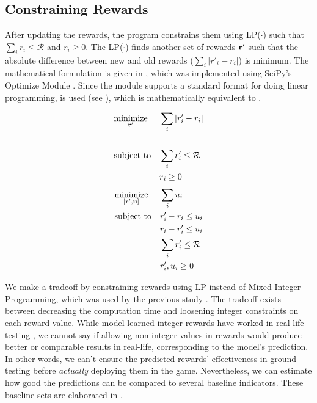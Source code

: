 \subsection{Constraining Rewards} \label{sec:Constraining Rewards}
After updating the rewards, the program constrains them using LP($\cdot$) such that $\sum_{i}r_i \leq \mathcal{R}$ and $r_i \geq 0$. The LP($\cdot$) finds another set of rewards $\mathbf{r'}$ such that the absolute difference between new and old rewards ($\sum_{i}|r'_i - r_i|$) is minimum. The mathematical formulation is given in , which was implemented using SciPy's Optimize Module \cite{SCPOptimizeDocs}. Since the module supports a standard format for doing linear programming,  is used (see ), which is mathematically equivalent to .
\begin{multicols}{2}
    \begin{equation} \label{eqn:lp_math_constrain_rewards}
        \begin{aligned}
            & \underset{\mathbf{r'}}{\text{minimize}}
            & & \sum_{i}|r'_i - r_i|\\ \\
            & \text{subject to}
            & & \sum_{i}r'_i \leq \mathcal{R}\\
            &&& r_i \geq 0
        \end{aligned}
    \end{equation}
    \begin{equation} \label{eqn:lp_code_constrain_rewards}
        \begin{aligned}
            & \underset{[\mathbf{r'}, \mathbf{u}]}{\text{minimize}}
            & & \sum_{i} u_i\\
            & \text{subject to}
            & & r'_i - r_i \leq u_i\\
            &&& r_i - r'_i \leq u_i\\
            &&& \sum_{i} r'_i \leq \mathcal{R}\\
            &&& r'_i, u_i \geq 0
        \end{aligned}
    \end{equation}
\end{multicols}

We make a tradeoff by constraining rewards using LP instead of Mixed Integer Programming, which was used by the previous study \cite{Xue2016Avi2}. The tradeoff exists between decreasing the computation time and loosening integer constraints on each reward value. While model-learned integer rewards have worked in real-life testing \cite{Xue2016Avi2}, we cannot say if allowing non-integer values in rewards would produce better or comparable results in real-life, corresponding to the model's prediction. In other words, we can't ensure the predicted rewards' effectiveness in ground testing before \textit{actually} deploying them in the game. Nevertheless, we can estimate how good the predictions can be compared to several baseline indicators. These baseline sets are elaborated in .